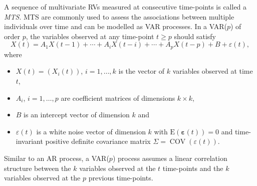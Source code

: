 A sequence of multivariate \acp{RV} measured at consecutive time-points is called a \textit{\ac{MTS}}. \ac{MTS} are commonly used to assess the associations between multiple individuals over time and can be modelled as \ac{VAR} processes. In a \ac{VAR}($p$) of order $p$, the variables observed at any time-point $t \geqslant p$ should satisfy
\begin{equation}
X(t)=A_{1} X(t-1)+\cdots+A_{i} X(t-i)+\cdots+A_{p} X(t-p)+B+\varepsilon(t),
\end{equation}
where
\begin{itemize}
\item $X(t)=\left(X_{i}(t)\right)$, $i=1,\ldots,k$ is the vector of $k$ variables observed at time $t$,
\item $A_{i}$, $i=1,\ldots,p$ are coefficient matrices of dimensions $k \times k$,
\item $B$ is an intercept vector of dimension $k$ and
\item $\varepsilon(t)$ is a white noise vector of dimension $k$ with $\mathrm{E}(\boldsymbol{\varepsilon}(t))=0$ and time-invariant positive definite covariance matrix $\Sigma = \operatorname{COV}(\varepsilon(t))$.
\end{itemize}
Similar to an \ac{AR} process, a \ac{VAR}($p$) process assumes a linear correlation structure between the $k$ variables observed at the $t$ time-points and the $k$ variables observed at the $p$ previous time-points.







